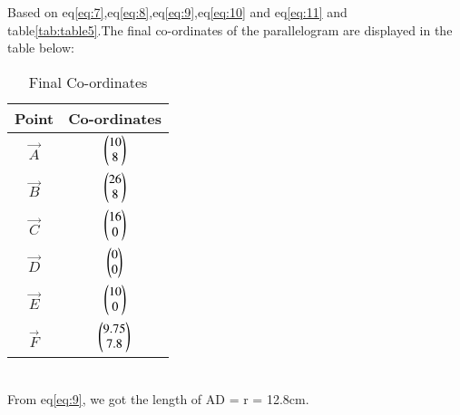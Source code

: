 Based on eq\ref{eq:7},eq\ref{eq:8},eq\ref{eq:9},eq\ref{eq:10} and eq\ref{eq:11} and table\ref{tab:table5}.The final co-ordinates of the  parallelogram are displayed in the table below:\\
\begin{table}[h]
	\centering
\begin{tabular}{|c|c|}
\hline
Point & Co-ordinates\\
\hline
$\vec{A}$ & $\begin{pmatrix}10\\8\end{pmatrix}$\\
\hline
$\vec{B}$ & $\begin{pmatrix}26\\8\end{pmatrix}$\\
\hline
$\vec{C}$ & $\begin{pmatrix}16\\0\end{pmatrix}$\\
\hline
$\vec{D}$ & $\begin{pmatrix}0\\0\end{pmatrix}$\\
\hline
$\vec{E}$ & $\begin{pmatrix}10\\0\end{pmatrix}$\\
\hline
$\vec{F}$ & $\begin{pmatrix}9.75\\7.8\end{pmatrix}$\\
\hline
\end{tabular}
	\caption{Final Co-ordinates}
	\label{tab:table6}
\end{table}\\
From eq\ref{eq:9}, we got the length of AD = r = 12.8cm.\\
